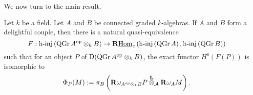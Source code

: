 We now turn to the main result.

\begin{theorem} \label{theorem: derived morita for NCP}
  Let \(k\) be a field. Let \(A\) and \(B\) be connected graded \(k\)-algebras. If \(A\) and \(B\) form a delightful couple, then there is a natural quasi-equivalence 
  \begin{displaymath}
    F : \operatorname{h-inj}\left(\operatorname{QGr}A^{\operatorname{op}} \otimes_k B\right) \to \mathbf{R}\underline{\operatorname{Hom}}_c\left( \operatorname{h-inj}\left(\operatorname{QGr}A\right), \operatorname{h-inj}\left(\operatorname{QGr}B\right) \right)
  \end{displaymath}
  such that for an object \(P\) of \(\mathrm{D}(\operatorname{QGr}A^{\operatorname{op}} \otimes_k B)\), the exact functor \(H^0(F(P))\) is isomorphic to 
  \begin{displaymath}
    \Phi_P(M) :=  \pi_B \left( \mathbf{R}\omega_{A^{\operatorname{op}} \otimes_k B} P \overset{\mathbf{L}}{\otimes}_{\mathcal A} \mathbf{R}\omega_A M \right).
  \end{displaymath}
\end{theorem}

